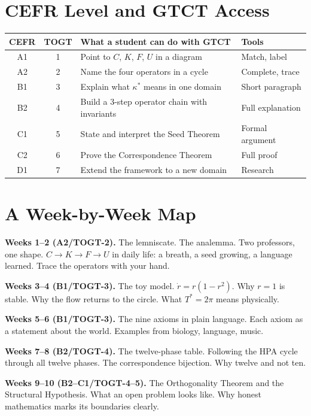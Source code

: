 \documentclass[12pt, openright]{book}
\theoremstyle{definition}
\theoremstyle{remark}
\begin{document}
\section{CEFR Level and GTCT Access}

\begin{center}
{\small
\begin{tabular}{ccll}
\toprule
\textbf{CEFR} & \textbf{TOGT} & \textbf{What a student can do with GTCT} & \textbf{Tools}\\
\midrule
A1 & 1 & Point to $C$, $K$, $F$, $U$ in a diagram & Match, label\\
A2 & 2 & Name the four operators in a cycle & Complete, trace\\
B1 & 3 & Explain what $\kappa^*$ means in one domain & Short paragraph\\
B2 & 4 & Build a 3-step operator chain with invariants & Full explanation\\
C1 & 5 & State and interpret the Seed Theorem & Formal argument\\
C2 & 6 & Prove the Correspondence Theorem & Full proof\\
D1 & 7 & Extend the framework to a new domain & Research\\
\bottomrule
\end{tabular}
}
\end{center}

\section{A Week-by-Week Map}

\textbf{Weeks 1--2 (A2/TOGT-2).}
The lemniscate. The analemma. Two professors, one shape.
$C \to K \to F \to U$ in daily life: a breath, a seed growing,
a language learned. Trace the operators with your hand.

\textbf{Weeks 3--4 (B1/TOGT-3).}
The toy model. $\dot{r} = r(1-r^2)$. Why $r=1$ is stable.
Why the flow returns to the circle. What $T^* = 2\pi$ means physically.

\textbf{Weeks 5--6 (B1/TOGT-3).}
The nine axioms in plain language. Each axiom as a statement
about the world. Examples from biology, language, music.

\textbf{Weeks 7--8 (B2/TOGT-4).}
The twelve-phase table. Following the HPA cycle through all twelve phases.
The correspondence bijection. Why twelve and not ten.

\textbf{Weeks 9--10 (B2--C1/TOGT-4--5).}
The Orthogonality Theorem and the Structural Hypothesis.
What an open problem looks like. Why honest mathematics
marks its boundaries clearly.
\end{document}
